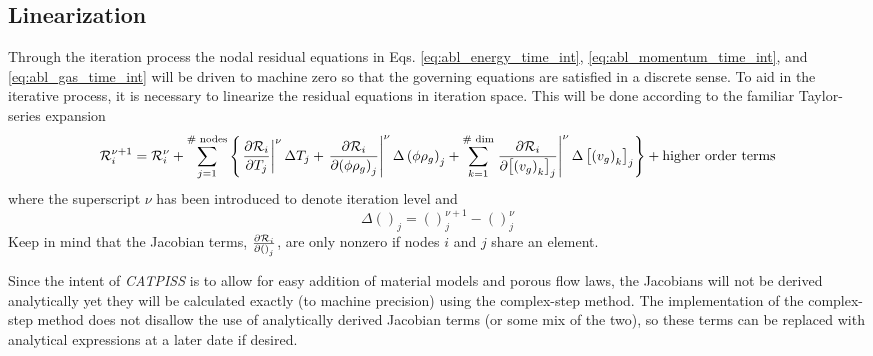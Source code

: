 \subsection{Linearization}
Through the iteration process the nodal residual equations in Eqs. \ref{eq:abl_energy_time_int}, \ref{eq:abl_momentum_time_int}, and \ref{eq:abl_gas_time_int} will be driven to machine zero so that the governing equations are satisfied in a discrete sense.  To aid in the iterative process, it is necessary to linearize the residual equations in iteration space.  This will be done according to the familiar Taylor-series expansion
\begin{equation}
  \mathcal{R}^{\nu+1}_{i} = \mathcal{R}^{\nu}_{i} + \sum_{j=1}^{\text{\# nodes}} \left\{ \left. {\frac{\partial{\mathcal{R}_{i}}}{\partial{T_{j}}}}\right\vert^{\nu}\Delta T_{j} + \left. {\frac{\partial{\mathcal{R}_{i}}}{\partial{\left( \phi \rho_{g} \right)_{j}}}}\right\vert^{\nu}\Delta \left( \phi \rho_{g} \right)_{j} + \sum_{k=1}^{\text{\# dim}} \left. {\frac{\partial{\mathcal{R}_{i}}}{\partial{\left[\left(v_{g}\right)_{k}\right]_{j}}}}\right\vert^{\nu}\Delta \left[\left(v_{g}\right)_{k}\right]_{j}  \right\} + \text{higher order terms}
  \label{residual_taylor_series}
\end{equation}
where the superscript $\nu$ has been introduced to denote iteration level and 
\begin{equation}
  \Delta \left(\right)_{j} = \left(\right)_{j}^{\nu+1} - \left(\right)_{j}^{\nu}
\end{equation}
 Keep in mind that the Jacobian terms, $ {\frac{\partial{\mathcal{R}_{i}}}{\partial{\left(\right)_{j}}}}$, are only nonzero if nodes $i$ and $j$ share an element.

Since the intent of \textit{CATPISS} is to allow for easy addition of material models and porous flow laws, the Jacobians will not be derived analytically yet they will be calculated exactly (to machine precision) using the complex-step method.  The implementation of the complex-step method does not disallow the use of analytically derived Jacobian terms (or some mix of the two), so these terms can be replaced with analytical expressions at a later date if desired.  

